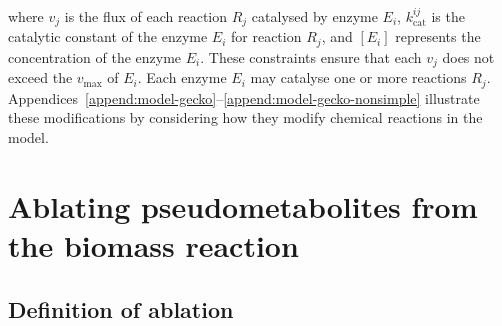 where $v_{j}$ is the flux of each reaction $R_{j}$ catalysed by enzyme $E_{i}$, $k_{\mathrm{cat}}^{ij}$ is the catalytic constant of the enzyme $E_{i}$ for reaction $R_{j}$, and $[E_{i}]$ represents the concentration of the enzyme $E_{i}$.
These constraints ensure that each $v_{j}$ does not exceed the $v_{\mathrm{max}}$ of $E_{i}$.
Each enzyme $E_{i}$ may catalyse one or more reactions $R_{j}$.
Appendices~\ref{append:model-gecko}--\ref{append:model-gecko-nonsimple} illustrate these modifications by considering how they modify chemical reactions in the model.






\section{Ablating pseudometabolites from the biomass reaction}
\label{sec:model-yeast8-pseudometabolites}

\subsection{Definition of ablation}
\label{sec:model-yeast8-pseudometabolites-def}


